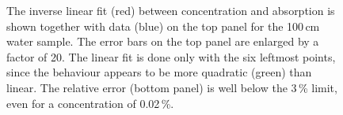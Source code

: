 \begin{figure}
	\centering
	\resizebox{0.9\textwidth}{!}{}
	\caption[Linear fit between Gd concentration and absorption with a 100\,cm water sample]%
		{The inverse linear fit (red) between concentration and absorption %
		is shown together with data (blue) on the top panel for the 100\,cm water sample.
		The error bars on the top panel are enlarged by a factor of 20.
		The linear fit is done only with the six leftmost points, %
		since the behaviour appears to be more quadratic (green) than linear.
		The relative error (bottom panel) is well below the 3\,\% limit, %
		even for a concentration of 0.02\,\%.}
	\label{fig:gad_1m}
\end{figure}

